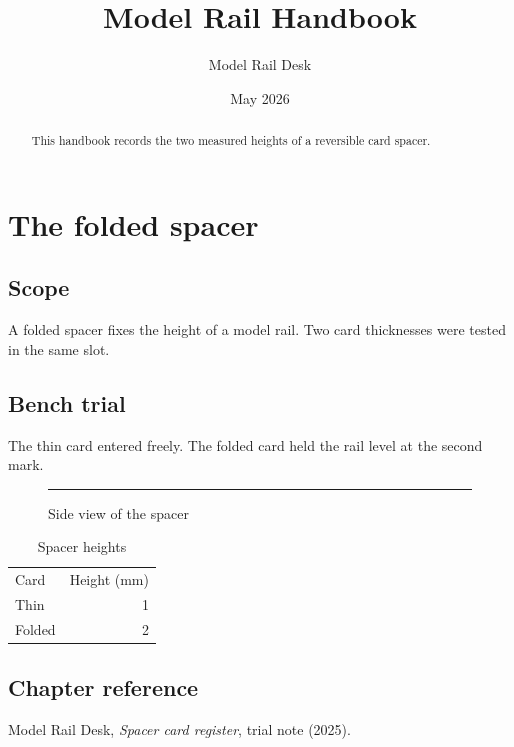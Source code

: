 \documentclass[oneside,openany]{amsbook}
\title{Model Rail Handbook}\author{Model Rail Desk}\address{Paper Model Workshop}
\date{May 2026}
\begin{document}
\begin{abstract}This handbook records the two measured heights of a reversible card spacer.\end{abstract}
\maketitle
\chapter{The folded spacer}\section*{Scope}A folded spacer fixes the height of a model rail. Two card thicknesses were tested in the same slot.
\section{Bench trial}
The thin card entered freely. The folded card held the rail level at the second mark.
\begin{figure}[ht]\centering\rule{28mm}{2mm}\caption{Side view of the spacer}\end{figure}
\begin{table}[ht]\centering\begin{tabular}{lr}Card&Height (mm)\\Thin&1\\Folded&2\end{tabular}\caption{Spacer heights}\end{table}
\section*{Chapter reference}Model Rail Desk, \emph{Spacer card register}, trial note (2025).
\end{document}
